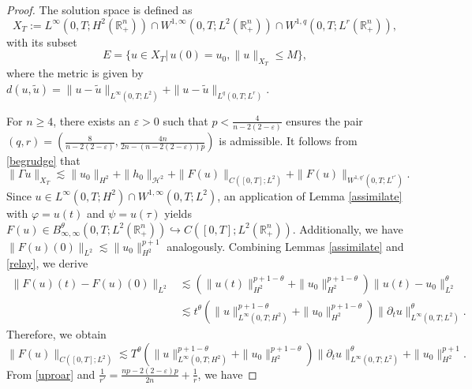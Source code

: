 \documentclass[preprint,compress,12pt]{elsarticle}
\numberwithin{equation}{section}
\begin{document}
\begin{proof}
	The solution space is defined as
	\begin{equation}
		X_{T}:=L^{\infty}(0,T;H^{2}(\mathbb{R}^{n}_{+}))\cap W^{1,\infty}(0,T;L^{2}(\mathbb{R}^{n}_{+}))\cap W^{1,q}(0,T;L^{r}(\mathbb{R}^{n}_{+})),
	\end{equation}
	with its subset
	\begin{equation*}
		E=\{ u\in X_{T}|\,u(0)=u_{0},\|u\|_{X_{T}}\leq M\},
	\end{equation*}
	where the metric is given by $d(u,\tilde{u})=\|u-\tilde{u}\|_{L^{\infty}(0,T;L^{2})}+\|u-\tilde{u}\|_{L^{q}(0,T;L^{r})}$.
	
	For $n\geq4$, there exists an $\varepsilon>0$ such that $p<\frac{4}{n-2(2-\varepsilon)}$ ensures the  pair $(q,r)=\left(\frac{8}{n-2(2-\varepsilon)},\frac{4n}{2n-(n-2(2-\varepsilon))p}\right)$ is admissible.  It follows from \eqref{begrudge} that
	\begin{equation}\label{rhetoric}
		\|\Gamma u\|_{X_{T}}\lesssim \|u_{0}\|_{H^{2}}+\|h_{0}\|_{\mathcal{H}^{2}}+\|F(u)\|_{C([0,T];L^{2})}+\|F(u)\|_{W^{1,q'}(0,T;L^{r'})}.
	\end{equation}
	Since $u \in L^\infty(0,T;H^2) \cap W^{1,\infty}(0,T;L^2)$, an application of Lemma \ref{assimilate} with $\varphi = u(t)$ and $\psi = u(\tau)$ yields
	$F(u) \in B^\theta_{\infty,\infty}(0,T;L^2(\mathbb{R}_{+}^{n})) \hookrightarrow C([0,T];L^2(\mathbb{R}_{+}^{n}))$.  Additionally, we have $\|F(u)(0)\|_{L^2} \lesssim \|u_0\|_{H^2}^{p+1}$ analogously. Combining Lemmas \ref{assimilate} and \ref{relay}, we derive
	\begin{equation*}
		\begin{aligned}
			\|F(u)(t)-F(u)(0)\|_{L^{2}}&\lesssim   \left(\|u(t)\|_{H^{2}}^{p+1-\theta}+\|u_{0}\|_{H^{2}}^{p+1-\theta}\right) \|u(t)-u_{0}\|_{L^{2}}^{\theta}\\&\lesssim  t^{\theta}\left( \|u\|_{L^{\infty}(0,T;H^{2})}^{p+1-\theta}+\|u_{0}\|_{H^{2}}^{p+1-\theta}\right)\|\partial_{t}u\|_{L^{\infty}(0,T;L^{2})}^{\theta}.
		\end{aligned}
	\end{equation*}
	Therefore, we obtain
	\begin{equation}\label{chamber}
		\|F(u)\|_{C([0,T];L^{2})}\lesssim  T^{\theta} \left(\|u\|_{L^{\infty}(0,T;H^{2})}^{p+1-\theta} +\|u_{0}\|_{H^{2}}^{p+1-\theta}\right)\|\partial_{t}u\|_{L^{\infty}(0,T;L^{2})}^{\theta}+\|u_{0}\|_{H^{2}}^{p+1}.
	\end{equation}
	From \eqref{uproar} and
	$\frac{1}{r'}= \frac{np-2(2-\varepsilon)p}{2n}+\frac{1}{r}$, we have

\end{proof}
\end{document}
